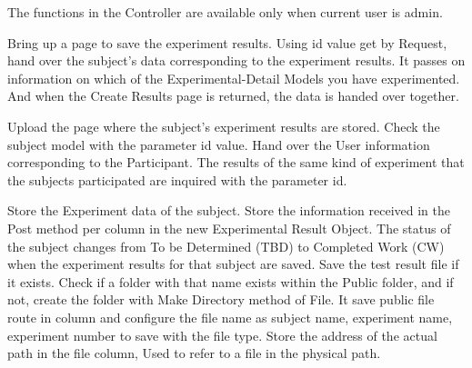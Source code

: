 \documentclass[letterpaper, 10 pt, conference]{ieeeconf}  %
\begin{document}
The functions in the Controller are available only when current user is admin.\\ 
Bring   up   a page  to  save  the  experiment  results.  Using  id  value  get  by Request,  hand  over  the  subject’s  data  corresponding  to  the experiment  results.  It  passes  on  information  on  which  of the Experimental-Detail Models you have experimented. And when the Create Results page is returned, the data is handed over  together. \\
Upload  the  page  where  the  subject’s experiment results are stored. Check the subject model with the  parameter  id  value.  Hand  over  the  User  information corresponding to the Participant. The results of the same kind of experiment that the subjects participated are inquired with the parameter id.\\
Store  the  Experiment  data  of  the  subject.  Store  the information  received  in  the  Post  method  per  column  in  the new  Experimental  Result  Object.  The  status  of  the  subject changes  from  To  be  Determined  (TBD)  to Completed Work (CW) when the experiment results for that subject are saved. Save the  test  result  file  if  it  exists.  Check  if  a  folder  with  that name  exists  within  the  Public  folder,  and  if  not,  create  the folder with Make Directory method of File. It save  public  file  route  in  column and configure the file name as subject name, experiment name, experiment number  to  save  with  the  file  type.  Store  the  address  of  the actual path in the file column, Used to refer to a file in the physical path.\\
\end{document}
